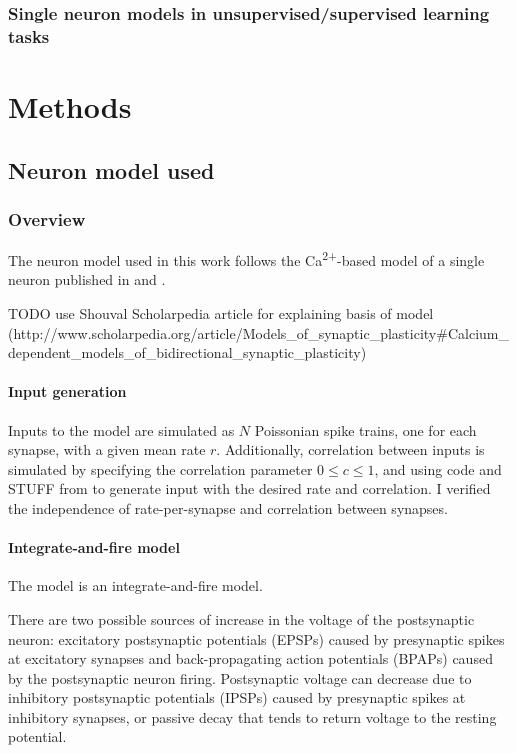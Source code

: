 \documentclass[a4paper,12pt]{report}
\theoremstyle{definition}
\begin{document}
\subsection{Single neuron models in unsupervised/supervised learning tasks}




\chapter{Methods}
\section{Neuron model used}
\subsection{Overview}
The neuron model used in this work follows the Ca\textsuperscript{2+}-based model of a single neuron published in \cite{shouval2002unified} and \cite{yeung2004synaptic}.

TODO use Shouval Scholarpedia article for explaining basis of model (http://www.scholarpedia.org/article/Models_of_synaptic_plasticity#Calcium_dependent_models_of_bidirectional_synaptic_plasticity)

\subsubsection{Input generation}
Inputs to the model are simulated as $N$ Poissonian spike trains, one for each synapse, with a given mean rate $r$. Additionally, correlation between inputs is simulated by specifying the correlation parameter $0 \leq c \leq 1$, and using code and STUFF from \cite{macke2009} to generate input with the desired rate and correlation. I verified the independence of rate-per-synapse and correlation between synapses.

\subsubsection{Integrate-and-fire model}

The model is an integrate-and-fire model.

There are two possible sources of increase in the voltage of the postsynaptic neuron: excitatory postsynaptic potentials (EPSPs) caused by presynaptic spikes at excitatory synapses and back-propagating action potentials (BPAPs) caused by the postsynaptic neuron firing. Postsynaptic voltage can decrease due to inhibitory postsynaptic potentials (IPSPs) caused by presynaptic spikes at inhibitory synapses, or passive decay that tends to return voltage to the resting potential.
\end{document}
